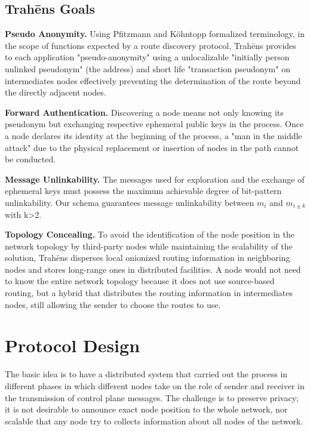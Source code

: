 \documentclass[12pt,oneside]{wlscirep}
\newcommand{\ProtoName}{Trah\={e}ns }
\begin{document}
\subsection{\ProtoName Goals}
\textbf{Pseudo Anonymity.} 
Using Pfitzmann and Köhntopp\cite{pfitzmann2001anonymity} formalized terminology, in the scope of functions expected by a route discovery protocol, \ProtoName provides to each application "pseudo-anonymity" using a unlocalizable "initially person unlinked pseudonym" (the address) and short life "transaction pseudonym" on intermediates nodes effectively preventing the determination of the route beyond the directly adjacent nodes.\par 
\textbf{Forward Authentication.} 
Discovering a node means not only knowing its pseudonym but exchanging respective ephemeral public keys in the process. Once a node declares its identity at the beginning of the process, a "man in the middle attack" due to the physical replacement or insertion of nodes in the path cannot be conducted.\par 
\textbf{Message Unlinkability.}
The messages used for exploration and the exchange of ephemeral keys must possess the maximum achievable degree of bit-pattern unlinkability. Our schema guarantees message unlinkability between $m_i$ and $m_{i \pm k}$  with k>2.\par
\textbf{Topology Concealing.}
To avoid the identification of the node position in the network topology by third-party nodes while maintaining the scalability of the solution, \ProtoName disperses local onionized routing information in neighboring nodes and stores long-range ones in distributed facilities. A node would not need to know the entire network topology because it does not use source-based routing, but a hybrid that distributes the routing information in intermediates nodes, still allowing the sender to choose the routes to use.\par

\clearpage
\section{Protocol Design}
\label{sec:design}
The basic idea is to have a distributed system that carried out the process in different phases in which different nodes take on the role of sender and receiver in the transmission of control plane messages. The challenge is to preserve privacy; it is not desirable to announce exact node position to the whole network, nor scalable that any node try to collects information about all nodes of the network.\par 
\end{document}
